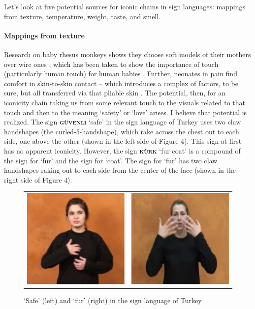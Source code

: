 \documentclass[output=paper,
modfonts
]{LSP/langsci}
\begin{document}
Let's look at five potential sources for iconic chains in sign
languages: mappings from texture, temperature, weight, taste, and smell.

\paragraph{Mappings from texture} Research on baby rhesus monkeys shows they
choose soft models of their mothers over wire ones \citep{harlow1959}, which
has been taken to show the importance of touch (particularly human
touch) for human babies \citep{lynch1970,schneider1996}. Further, neonates
in pain find comfort in skin-to-skin contact -- which introduces a
complex of factors, to be sure, but all transferred via that pliable
skin \citep{kostandy2008}. The potential, then, for an iconicity chain taking
us from some relevant touch to the visuals related to that touch and
then to the meaning `safety' or `love' arises. I believe that potential
is realized. The sign \textbf{\textsc{güvenli}} `safe' in the sign
language of Turkey uses two claw handshapes (the curled-5-handshape),
which rake across the chest out to each side, one above the other (shown
in the left side of Figure 4). This sign at first has no apparent
iconicity. However, the sign \textbf{\textsc{kürk}} `fur coat' is a
compound of the sign for `fur' and the sign for `coat'. The sign for
`fur' has two claw handshapes raking out to each side from the center of
the face (shown in the right side of Figure 4).

\begin{figure}
	\begin{tabularx}{\textwidth}{CC}
	\includegraphics{napoli_fig4a} & \includegraphics{napoli_fig4b}\\
	\end{tabularx}
\centering\caption{ `Safe' (left) and `fur' (right) in the sign language of
Turkey}
\label{fig:4}
\end{figure}
\end{document}
